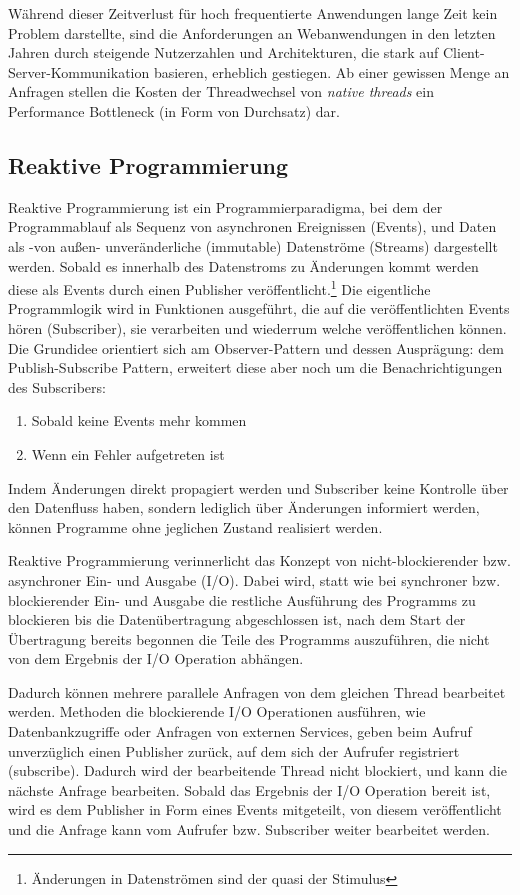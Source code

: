 Während dieser Zeitverlust für hoch frequentierte Anwendungen lange Zeit kein Problem darstellte,
sind die Anforderungen an Webanwendungen in den letzten Jahren durch steigende Nutzerzahlen und Architekturen,
die stark auf Client-Server-Kommunikation basieren, erheblich gestiegen.
Ab einer gewissen Menge an Anfragen stellen die Kosten der Threadwechsel von \textit{native threads} ein Performance Bottleneck
(in Form von Durchsatz) dar.

\subsection{Reaktive Programmierung}
\label{section:reaktive_programmierung}
Reaktive Programmierung ist ein Programmierparadigma, bei dem der Programmablauf als Sequenz von asynchronen Ereignissen (Events), und
Daten als -von außen- unveränderliche (immutable) Datenströme (Streams) dargestellt werden.
Sobald es innerhalb des Datenstroms zu Änderungen kommt werden diese als Events durch einen Publisher veröffentlicht.\footnote{Änderungen in Datenströmen
    sind der quasi der Stimulus}
Die eigentliche Programmlogik wird in Funktionen ausgeführt, die auf die veröffentlichten Events hören (Subscriber), sie verarbeiten und wiederrum welche
veröffentlichen können. Die Grundidee orientiert sich am Observer-Pattern und dessen Ausprägung: dem Publish-Subscribe Pattern, erweitert diese aber
noch um die Benachrichtigungen des Subscribers:
\begin{enumerate}
    \item Sobald keine Events mehr kommen
    \item Wenn ein Fehler aufgetreten ist
\end{enumerate}
Indem Änderungen direkt propagiert werden und Subscriber keine Kontrolle über den Datenfluss haben, sondern lediglich über Änderungen informiert werden,
können Programme ohne jeglichen Zustand realisiert werden\parencite{Escoffier2017}.


Reaktive Programmierung verinnerlicht das Konzept von nicht-blockierender bzw. asynchroner Ein- und Ausgabe (I/O).
Dabei wird, statt wie bei synchroner bzw. blockierender Ein- und Ausgabe die restliche Ausführung des Programms
zu blockieren bis die Datenübertragung abgeschlossen ist, nach dem Start der Übertragung bereits begonnen die Teile des
Programms auszuführen, die nicht von dem Ergebnis der I/O Operation abhängen.

Dadurch können mehrere parallele Anfragen von dem gleichen Thread bearbeitet werden.
Methoden die blockierende I/O Operationen ausführen, wie Datenbankzugriffe oder Anfragen von externen Services,
geben beim Aufruf unverzüglich einen Publisher zurück, auf dem sich der Aufrufer registriert (subscribe).
Dadurch wird der bearbeitende Thread nicht blockiert, und kann die nächste Anfrage bearbeiten.
Sobald das Ergebnis der I/O Operation bereit ist, wird es dem Publisher in Form eines Events mitgeteilt, von diesem veröffentlicht und die Anfrage kann
vom Aufrufer bzw. Subscriber weiter bearbeitet werden.

